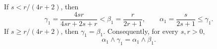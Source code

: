 If \(s<r/(4r+2)\), then
\[
\gamma_1=\frac{4sr}{4sr+2s+r}<\beta_1=\frac{r}{2r+1},
\qquad
\alpha_1=\frac{s}{2s+1}\leq\gamma_1.
\]
If \(s\geq r/(4r+2)\), then \(\gamma_1=\beta_1\).  Consequently, for every \(s,r>0\),
\[
\alpha_1\wedge\gamma_1=\alpha_1\wedge\beta_1.
\]